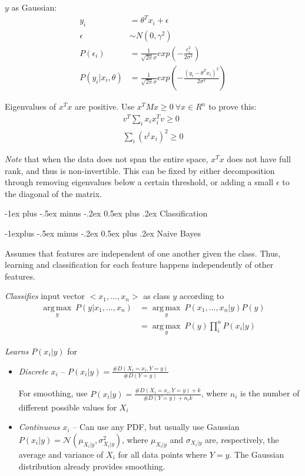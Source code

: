 \documentclass[10pt,landscape]{article}
\makeatletter
\renewcommand{\section}{\@startsection{section}{1}{0mm}%
                                {-1ex plus -.5ex minus -.2ex}%
                                {0.5ex plus .2ex}%
                                {\normalfont\large\bfseries}}
\renewcommand{\subsection}{\@startsection{subsection}{2}{0mm}%
                                {-1explus -.5ex minus -.2ex}%
                                {0.5ex plus .2ex}%
                                {\normalfont\normalsize\bfseries}}
\DeclareMathOperator*{\argmax}{arg\,max}
\makeatother
\begin{document}
\begin{multicols}{3}
$y$ as Gaussian:
\begin{align*}
y_i &= \theta^T x_i + \epsilon\\
\epsilon &\sim N(0, \gamma^2)\\
P(\epsilon_i) &= \frac{1}{\sqrt{2\pi} \sigma} exp \left( - \frac{\epsilon_i^2}{2 \sigma^2} \right)\\
P(y_i | x_i, \theta) &= \frac{1}{\sqrt{2 \pi} \sigma} exp \left( - \frac{(y_i - \theta^T x_i)^2}{2 \sigma^2} \right)
\end{align*}

Eigenvalues of $x^T x$ are positive. Use $x^T M x \geq 0 \:\forall x \in R^n$ to prove this:
\begin{align*}
v^T \sum_{i} x_i x_i^T v \geq 0\\
\sum_{i} (v^t x_i)^2 \geq 0
\end{align*}

\emph{Note} that when the data does not span the entire space, $x^T x$ does not have full rank, and thus is non-invertible. This can be fixed by either decomposition through removing eigenvalues below a certain threshold, or adding a small $\epsilon$ to the diagonal of the matrix.

\section{Classification}

\subsection{Naive Bayes}

Assumes that features are independent of one another given the class. Thus, learning and classification for each feature happens independently of other features.

\emph{Classifies} input vector $<x_1, ..., x_n>$ as class $y$ according to
\begin{align*}
	\underset{y}{\argmax} \ P(y | x_1, ..., x_n)
	&= \underset{y}{\argmax} \ P(x_1, ..., x_n | y) P(y)\\
	&= \underset{y}{\argmax} \ P(y) \prod_{i}^{n} P(x_i | y)
\end{align*}

\emph{Learns} $P(x_i | y)$ for
\begin{itemize}
	\item \emph{Discrete $x_i$} -- $P(x_i | y) = \frac{\#D(X_i = x_i, Y = y)}{\#D(Y = y)}$
	
	For smoothing, use $P(x_i | y) = \frac{\#D(X_i = x_i, Y = y) + k}{\#D(Y = y) + n_i k}$, where $n_i$ is the number of different possible values for $X_i$
	\item \emph{Continuous $x_i$} -- Can use any PDF, but usually use Gaussian $P(x_i | y) = \mathcal{N}(\mu_{X_i | y}, \sigma_{X_i | y}^2)$, where $\mu_{X_i | y}$ and $\sigma_{X_i | y}$ are, respectively, the average and variance of $X_i$ for all data points where $Y = y$. The Gaussian distribution already provides smoothing.
\end{itemize}


\end{multicols}
\end{document}

